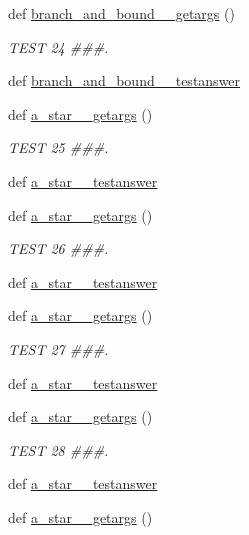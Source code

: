 \begin{DoxyCompactItemize}
\item 
def \hyperlink{namespacetests_ae733ae65b494d32a1e53924c66b471d4}{branch\+\_\+and\+\_\+bound\+\_\+\_\+getargs} ()
\begin{DoxyCompactList}\small\item\em T\+E\+S\+T 24 \#\#\#. \end{DoxyCompactList}\item 
def \hyperlink{namespacetests_a7e6708c672080b31f07779b8abb08679}{branch\+\_\+and\+\_\+bound\+\_\+\_\+testanswer}
\item 
def \hyperlink{namespacetests_a57e27c223f4eb1d66587aa4d1bc2f46c}{a\+\_\+star\+\_\+\_\+getargs} ()
\begin{DoxyCompactList}\small\item\em T\+E\+S\+T 25 \#\#\#. \end{DoxyCompactList}\item 
def \hyperlink{namespacetests_a0cb2514bf5eafa2161fc4b60da9694d1}{a\+\_\+star\+\_\+\_\+testanswer}
\item 
def \hyperlink{namespacetests_ac9363ecc89d1307598e54bc15d79de85}{a\+\_\+star\+\_\+\_\+getargs} ()
\begin{DoxyCompactList}\small\item\em T\+E\+S\+T 26 \#\#\#. \end{DoxyCompactList}\item 
def \hyperlink{namespacetests_a9be524ccd0f3347786b3a7ccf0496c57}{a\+\_\+star\+\_\+\_\+testanswer}
\item 
def \hyperlink{namespacetests_abe940fc9565165b1f0ec6e186ba68c87}{a\+\_\+star\+\_\+\_\+getargs} ()
\begin{DoxyCompactList}\small\item\em T\+E\+S\+T 27 \#\#\#. \end{DoxyCompactList}\item 
def \hyperlink{namespacetests_a15a246adbcb6607679adb26c1dabfa3c}{a\+\_\+star\+\_\+\_\+testanswer}
\item 
def \hyperlink{namespacetests_aa3b6a7e528000f03b148d0f35e79a4d3}{a\+\_\+star\+\_\+\_\+getargs} ()
\begin{DoxyCompactList}\small\item\em T\+E\+S\+T 28 \#\#\#. \end{DoxyCompactList}\item 
def \hyperlink{namespacetests_a34c1f0c2c8dfec03085673ff230b4df0}{a\+\_\+star\+\_\+\_\+testanswer}
\item 
def \hyperlink{namespacetests_af9256bb4f2855871476941dcb0a13e17}{a\+\_\+star\+\_\+\_\+getargs} ()

\end{DoxyCompactItemize}
